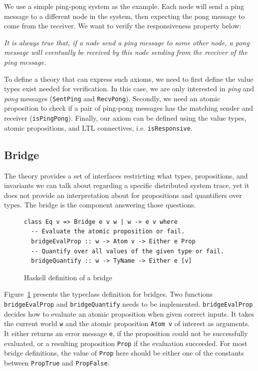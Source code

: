 \documentclass[format=acmsmall, nonacm=true, review=true, screen=true]{acmart}
\newcommand{\mycaption}[1]{\Description{#1}\caption{#1}}
\begin{document}
We use a simple ping-pong system as the example. Each node will send a ping message to a different node in the system, then expecting the pong message to come from the receiver. We want to verify the
responsiveness property below:

\textit{It is always true that, if a node send a ping message to some other node, a pong message will eventually be received by this node sending from the receiver of the ping message.}

To define a theory that can express such axioms, we need to first define the value types exist needed for verification. In this case, we are only interested in \textit{ping} and \textit{pong} messages (\texttt{SentPing} and \texttt{RecvPong}).
Secondly, we need an atomic proposition to check if a pair of ping-pong messages has the matching sender and receiver (\texttt{isPingPong}).
Finally, our axiom can be defined using the value types, atomic propositions, and LTL connectives, i.e. \texttt{isResponsive}.

\subsection{Bridge}
\label{subsec:bridge}

The theory provides a set of interfaces restricting what types, propositions, and invariants we can talk about regarding a specific distributed system trace, yet it does not provide an interpretation about for propositions and quantifiers over types.
The bridge is the component answering those questions.

\begin{figure}[h]
  {
    \fontsize{10}{12}\selectfont
    \begin{verbatim}
class Eq v => Bridge e v w | w -> e v where
  -- Evaluate the atomic proposition or fail.
  bridgeEvalProp :: w -> Atom v -> Either e Prop
  -- Quantify over all values of the given type or fail.
  bridgeQuantify :: w -> TyName -> Either e [v]
\end{verbatim}
  }
  \mycaption{Haskell definition of a bridge}
  \label{fig:bridge-sig}
\end{figure}

Figure~\ref{fig:bridge-sig} presents the typeclass definition for bridges.
Two functions \texttt{bridgeEvalProp} and \texttt{bridgeQuantify} needs to be implemented.
\texttt{bridgeEvalProp} decides how to evaluate an atomic proposition when given correct inputs. It takes the current world \texttt{w} and the atomic proposition \texttt{Atom v} of interest as arguments.
It either returns an error message \texttt{e}, if the proposition could not be successfully evaluated, or a resulting proposition \texttt{Prop} if the evaluation succeeded.
For most bridge definitions, the value of \texttt{Prop} here should be either one of the constants between \texttt{PropTrue} and \texttt{PropFalse}.
\end{document}
